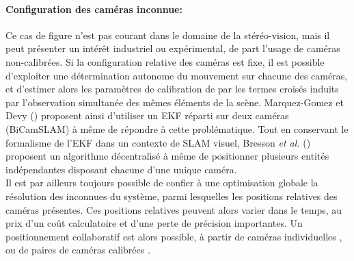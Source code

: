 \paragraph{Configuration des caméras inconnue:\\}
Ce cas de figure n'est pas courant dans le domaine de la stéréo-vision, mais il peut présenter un intérêt industriel ou expérimental, de part l'usage de caméras non-calibrées. Si la configuration relative des caméras est fixe, il est possible d'exploiter une détermination autonome du mouvement sur chacune des caméras, et d'estimer alors les paramètres de calibration de par les termes croisés induits par l'observation simultanée des mêmes éléments de la scène. Marquez-Gomez et Devy (\cite{Devy}) proposent ainsi d'utiliser un EKF  réparti sur deux caméras (BiCamSLAM) à même de répondre à cette problématique. Tout en conservant le formalisme de l'EKF dans un contexte de SLAM visuel, Bresson \textit{et al.} (\cite{Bresson2012}) proposent un algorithme décentralisé à même de positionner plusieurs entités indépendantes disposant chacune d'une unique caméra. \\
Il est par ailleurs toujours possible de confier à une optimisation globale la résolution des inconnues du système, parmi lesquelles les positions relatives des caméras présentes. Ces positions relatives peuvent alors varier dans le temps, au prix d'un coût calculatoire et d'une perte de précision importantes. Un positionnement collaboratif est alors possible, à partir de caméras individuelles \cite{Zou}, ou de paires de caméras calibrées \cite{Gil2010}.

